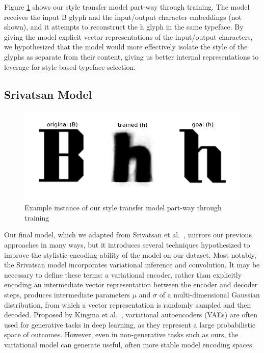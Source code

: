 Figure \ref{fig:styletransfer-example} shows our style transfer model part-way through training. The model receives the input { B} glyph and the input/output character embeddings (not shown), and it attempts to reconstruct the { h} glyph in the same typeface. By giving the model explicit vector representations of the input/output characters, we hypothesized that the model would more effectively isolate the style of the glyphs as separate from their content, giving us better internal representations to leverage for style-based typeface selection.

\subsection{Srivatsan Model}

\begin{figure}[]
    \centering
    \includegraphics[width=\textwidth]{images/styletransfer-example.png}
    \caption{Example instance of our style transfer model part-way through training}
    \label{fig:styletransfer-example}
\end{figure}

Our final model, which we adapted from Srivatsan et al.\ \cite{srivatsan2020}, mirrors our previous approaches in many ways, but it introduces several techniques hypothesized to improve the stylistic encoding ability of the model on our dataset. Most notably, the Srivatsan model incorporates variational inference and convolution. It may be necessary to define these terms: a variational encoder, rather than explicitly encoding an intermediate vector representation between the encoder and decoder steps, produces intermediate parameters $\mu$ and $\sigma$ of a multi-dimensional Gaussian distribution, from which a vector representation is randomly sampled and then decoded. Proposed by Kingma et al.\ \cite{kingma2019}, variational autoencoders (VAEs) are often used for generative tasks in deep learning, as they represent a large probabilistic space of outcomes. However, even in non-generative tasks such as ours, the variational model can generate useful, often more stable model encoding spaces.

